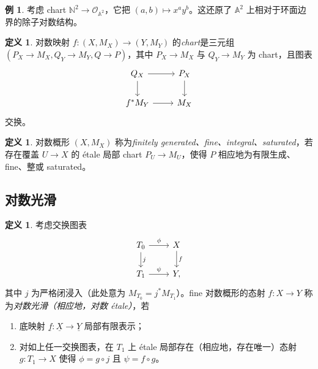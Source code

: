 \documentclass{amsart}
\theoremstyle{definition}
\newtheorem{defn}[thm]{定义}
\newtheorem{exm}[thm]{例}
\theoremstyle{remark}
\theoremstyle{plain}
\theoremstyle{definition}
\theoremstyle{remark}
\newcommand{\A}{\mathbb{A}}
\newcommand{\N}{\mathbb{N}}
\newcommand{\mc}[1]{\mathcal{#1}}
\newcommand{\ul}[1]{\underline{#1}}
\newcommand{\1}{\mathbf{1}}
\newcommand{\2}{\mathbf{2}}
\newcommand{\3}{\mathbf{3}}
\begin{document}
\begin{exm}
    考虑 chart \(\N^2 \to \mc{O}_{\A^2}\)，它把 \((a,b) \mapsto x^a y^b\)。这还原了 \(\A^2\) 上相对于环面边界的除子对数结构。
\end{exm}

\begin{defn}
    对数映射 \(f \colon (X, M_X) \to (Y, M_Y)\) 的\textit{chart}是三元组 \((P_X\to M_X, Q_Y \to M_Y, Q \to P)\)，其中 \(P_X \to M_X\) 与 \(Q_Y \to M_Y\) 为 chart，且图表
    \begin{equation*}
    \begin{tikzcd}
        Q_X \ar{r} \ar{d} & P_X \ar{d} \\
        f^* M_Y \ar{r} & M_X
    \end{tikzcd}
    \end{equation*}
    交换。
\end{defn}

\begin{defn}
    对数概形 \((X, M_X)\) 称为\textit{finitely generated、fine、integral、saturated}，若存在覆盖 \(U \to X\) 的 \'etale 局部 chart \(P_U \to M_U\)，使得 \(P\) 相应地为有限生成、fine、整或 saturated。
\end{defn}

\subsection{对数光滑}%
\label{sub:Log smoothness}

\begin{defn}
    考虑交换图表
    \begin{equation*}
    \begin{tikzcd}
        T_0 \ar{r}{\phi} \ar{d}{j} & X \ar{d}{f} \\
        T_1 \ar{r}{\psi} & Y,
    \end{tikzcd}
    \end{equation*}
    其中 \(j\) 为严格闭浸入（此处意为 \(M_{T_0} = j^* M_{T_1}\)）。fine 对数概形的态射 \(f \colon X \to Y\) 称为\textit{对数光滑（相应地，对数 \'etale）}，若
    \begin{enumerate}
        \item 底映射 \(\ul{f} \colon \ul{X} \to \ul{Y}\) 局部有限表示；
        \item 对如上任一交换图表，在 \(T_1\) 上 \'etale 局部存在（相应地，存在唯一）态射 \(g \colon T_1 \to X\) 使得 \(\phi = g \circ j\) 且 \(\psi = f \circ g\)。
    \end{enumerate}
\end{defn}
\end{document}
